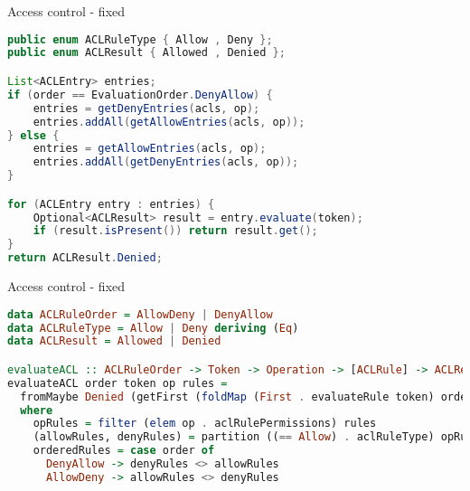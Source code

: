 \documentclass[ignorenonframetext,aspectratio=169]{beamer}
\begin{document}


\begin{frame}[fragile]{Access control - fixed}
\begin{lstlisting}[language=Java]
public enum ACLRuleType { Allow , Deny };
public enum ACLResult { Allowed , Denied };

List<ACLEntry> entries;
if (order == EvaluationOrder.DenyAllow) {
    entries = getDenyEntries(acls, op);
    entries.addAll(getAllowEntries(acls, op));
} else {
    entries = getAllowEntries(acls, op);
    entries.addAll(getDenyEntries(acls, op));
}

for (ACLEntry entry : entries) {
    Optional<ACLResult> result = entry.evaluate(token);
    if (result.isPresent()) return result.get();
}
return ACLResult.Denied;
\end{lstlisting}
\end{frame}

\begin{frame}[fragile]{Access control - fixed}
\begin{lstlisting}[language=Haskell]
data ACLRuleOrder = AllowDeny | DenyAllow
data ACLRuleType = Allow | Deny deriving (Eq)
data ACLResult = Allowed | Denied

evaluateACL :: ACLRuleOrder -> Token -> Operation -> [ACLRule] -> ACLResult
evaluateACL order token op rules =
  fromMaybe Denied (getFirst (foldMap (First . evaluateRule token) orderedRules))
  where
    opRules = filter (elem op . aclRulePermissions) rules
    (allowRules, denyRules) = partition ((== Allow) . aclRuleType) opRules
    orderedRules = case order of
      DenyAllow -> denyRules <> allowRules
      AllowDeny -> allowRules <> denyRules
\end{lstlisting}
\end{frame}
\end{document}
